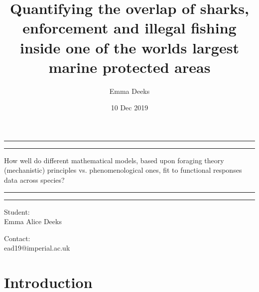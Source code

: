 \documentclass[11pt]{article}
\title {Quantifying the overlap of sharks, enforcement and illegal fishing inside one of the worlds largest marine protected areas}
\author{Emma Deeks}
\date{10 Dec 2019}
\begin{document}
	
	\begin{titlepage}
		
		
		\centering %
		
		
		
		
		
		\vspace*{5\baselineskip}
		
		\rule{\textwidth}{1.6pt}\vspace*{-\baselineskip}\vspace*{2pt} %
		\rule{\textwidth}{0.4pt} %
		
		\vspace{0.75\baselineskip} %
		
		{\LARGE How well do different mathematical models, based upon foraging theory (mechanistic) principles vs. phenomenological ones, fit to functional responses data across species? \\} 
		
		\vspace{0.75\baselineskip} %
		
		\rule{\textwidth}{0.4pt}\vspace*{-\baselineskip}\vspace{3.2pt} 
		\rule{\textwidth}{1.6pt} 
		
		\vspace{2\baselineskip} 
		

Student: \\
Emma Alice Deeks \\ 
	
		\vspace{1.5 \baselineskip} %
		
		Contact: \\
		ead19@imperial.ac.uk
		

	\end{titlepage}
	
	\linenumbers
	\doublespacing
	\section{Introduction}
	\noindent
\end{document}
